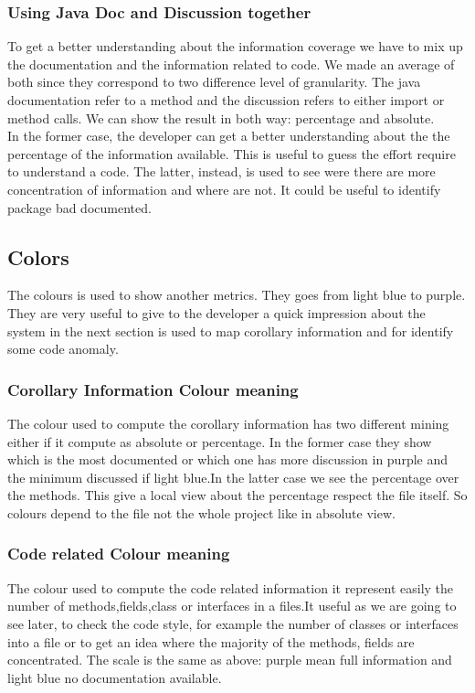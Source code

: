 \documentclass[]{usiinfbachelorproject}
\begin{document}
\subsubsection{Using Java Doc and Discussion together}
To get a better understanding about the information coverage we have to mix up the documentation and the information related to code. We made an average of both since they correspond to two difference level of granularity. The java documentation refer to a method and the discussion refers to either import or method calls. We can show the result in both way: percentage and absolute.\\
In the former case, the developer can get a better understanding about the the percentage of the information available. This is useful to guess the effort require to understand a code. The latter, instead, is used to see were there are more concentration of information and where are not. It could be useful to identify package bad documented.
  



\subsection{Colors}
The colours is used to show another metrics. They goes from light blue to purple. They are very useful to give to the developer a quick impression about the system  in the next section is used to map corollary information and for identify some code anomaly.
\subsubsection{Corollary Information Colour meaning}
The colour used to compute the corollary information has two different mining either if it compute as absolute or percentage. In the former case they show which is the most documented or which one has more discussion in purple and the minimum discussed if light blue.In the latter case we see the percentage over the methods. This give a local view about the percentage respect the file itself. So colours depend to the file not the whole project like in absolute view.

\subsubsection{Code related Colour meaning}

The colour used to compute the code related information it  represent easily the number of methods,fields,class or interfaces in a files.It useful as we are going to see later, to check the code style, for example the number of classes or interfaces into a file or to get an idea where the majority of the methods, fields are concentrated.
The scale is the same as above: purple mean full information and light blue no documentation available.
\end{document}
